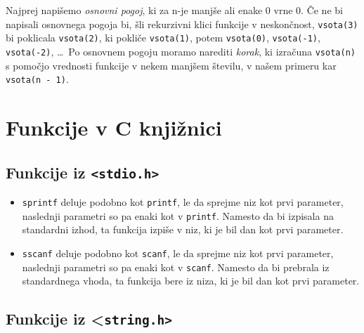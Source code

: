 \documentclass{book}
\begin{document}
\begin{examples}
\end{examples}

Najprej napišemo \emph{osnovni pogoj}, ki za n-je manjše ali enake 0 vrne 0. Če
ne bi napisali osnovnega pogoja bi, šli rekurzivni klici funkcije v neskončnost,
\verb+vsota(3)+ bi poklicala \verb+vsota(2)+, ki pokliče \verb+vsota(1)+, potem
\verb+vsota(0)+, \verb+vsota(-1)+, \verb+vsota(-2)+, \ldots \ Po osnovnem
pogoju moramo narediti \emph{korak}, ki izračuna \verb+vsota(n)+ s pomočjo
vrednosti funkcije v nekem manjšem številu, v našem primeru kar
\verb+vsota(n - 1)+.


\section{Funkcije v C knjižnici}

\subsection{Funkcije iz \texttt{<stdio.h>}}

\begin{itemize}
    \item \verb+sprintf+ deluje podobno kot \verb+printf+, le da sprejme niz
        kot prvi parameter, naslednji parametri so pa enaki kot v
        \verb+printf+. Namesto da bi izpisala na standardni izhod, ta funkcija
        izpiše v niz, ki je bil dan kot prvi parameter.
    \item \verb+sscanf+ deluje podobno kot \verb+scanf+, le da sprejme niz kot
        prvi parameter, naslednji parametri so pa enaki kot v \verb+scanf+.
        Namesto da bi prebrala iz standardnega vhoda, ta funkcija bere iz niza,
        ki je bil dan kot prvi parameter.
\end{itemize}

\begin{examples}
\end{examples}

\subsection{Funkcije iz <\texttt{string.h>}}
\end{document}
